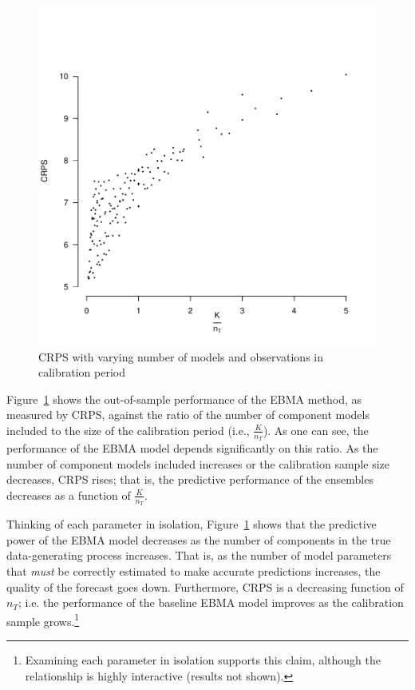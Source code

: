 \documentclass[12pt,fullpage,endnotes]{article}
\begin{document}
\begin{figure}[ht]
\caption{CRPS with varying number of models and observations in calibration period}
\label{simplot1}
\centering
\includegraphics[scale=.5]{2D}
\end{figure}

Figure~\ref{simplot1} shows the out-of-sample performance of the
EBMA method, as measured by CRPS, against the ratio of the number of
component models included to the size of the calibration period
(i.e., $\frac{K}{n_T}$). As one can see, the performance of the EBMA model
depends significantly on this ratio. As the number of component models
included increases or the calibration sample size
decreases, CRPS rises; that is, the predictive performance of the
ensembles decreases as a function of $\frac{K}{n_T}$.

Thinking of each parameter in isolation, Figure~\ref{simplot1} shows
that the predictive power of the EBMA model decreases as the number of
components in the true data-generating process increases. That is, as
the number of model parameters that \textit{must} be correctly
estimated to make accurate predictions increases, the quality of the
forecast goes down. Furthermore, CRPS is a decreasing function of $n_{T}$;
i.e. the performance of the baseline EBMA model improves as the
calibration sample grows.\footnote{Examining each parameter in
  isolation supports this claim, although the relationship is highly
  interactive (results not shown).}
\end{document}
